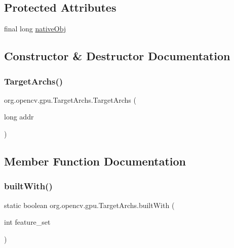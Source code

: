 \subsection*{Protected Attributes}
\begin{DoxyCompactItemize}
\item 
final long \mbox{\hyperlink{classorg_1_1opencv_1_1gpu_1_1_target_archs_aeed15bdb07efea2c91a2ae74f58a706d}{native\+Obj}}
\end{DoxyCompactItemize}


\subsection{Constructor \& Destructor Documentation}
\mbox{\label{classorg_1_1opencv_1_1gpu_1_1_target_archs_a72e504860cf9e2ad06a7dc4790abc2c2}} 
\subsubsection{\texorpdfstring{Target\+Archs()}{TargetArchs()}}
{\footnotesize\ttfamily org.\+opencv.\+gpu.\+Target\+Archs.\+Target\+Archs (\begin{DoxyParamCaption}\item[{long}]{addr }\end{DoxyParamCaption})\hspace{0.3cm}{\ttfamily [protected]}}



\subsection{Member Function Documentation}
\mbox{\label{classorg_1_1opencv_1_1gpu_1_1_target_archs_ae9f6e214f3f09be29813333a301356dd}} 
\subsubsection{\texorpdfstring{built\+With()}{builtWith()}}
{\footnotesize\ttfamily static boolean org.\+opencv.\+gpu.\+Target\+Archs.\+built\+With (\begin{DoxyParamCaption}\item[{int}]{feature\+\_\+set }\end{DoxyParamCaption})\hspace{0.3cm}{\ttfamily [static]}}

